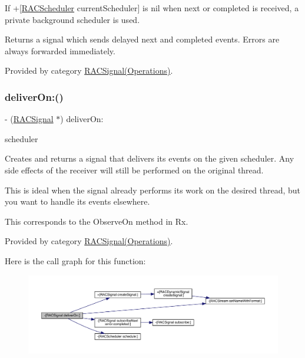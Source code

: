 If +\mbox{[}\mbox{\hyperlink{interface_r_a_c_scheduler}{R\+A\+C\+Scheduler}} current\+Scheduler\mbox{]} is nil when {\ttfamily next} or {\ttfamily completed} is received, a private background scheduler is used.

Returns a signal which sends delayed {\ttfamily next} and {\ttfamily completed} events. Errors are always forwarded immediately. 

Provided by category \mbox{\hyperlink{category_r_a_c_signal_07_operations_08_adc28e5c64d2e6ec8c5ab8465fa6c89b4}{R\+A\+C\+Signal(\+Operations)}}.

\mbox{\label{interface_r_a_c_signal_a69e4dc1c476da42ed829caed84fbd258}} 
\subsubsection{\texorpdfstring{deliver\+On\+:()}{deliverOn:()}\hspace{0.1cm}{\footnotesize\ttfamily [1/3]}}
{\footnotesize\ttfamily -\/ (\mbox{\hyperlink{interface_r_a_c_signal}{R\+A\+C\+Signal}} $\ast$) deliver\+On\+: \begin{DoxyParamCaption}\item[{(\mbox{\hyperlink{interface_r_a_c_scheduler}{R\+A\+C\+Scheduler}} $\ast$)}]{scheduler }\end{DoxyParamCaption}}

Creates and returns a signal that delivers its events on the given scheduler. Any side effects of the receiver will still be performed on the original thread.

This is ideal when the signal already performs its work on the desired thread, but you want to handle its events elsewhere.

This corresponds to the {\ttfamily Observe\+On} method in Rx. 

Provided by category \mbox{\hyperlink{category_r_a_c_signal_07_operations_08_a69e4dc1c476da42ed829caed84fbd258}{R\+A\+C\+Signal(\+Operations)}}.

Here is the call graph for this function\+:\nopagebreak
\begin{figure}[H]
\begin{center}
\leavevmode
\includegraphics[width=350pt]{interface_r_a_c_signal_a69e4dc1c476da42ed829caed84fbd258_cgraph}
\end{center}
\end{figure}
\mbox{\label{interface_r_a_c_signal_a69e4dc1c476da42ed829caed84fbd258}} 
